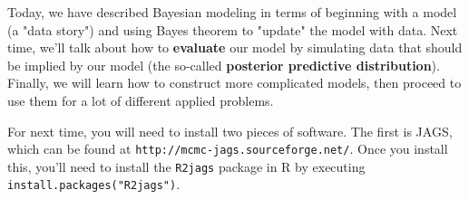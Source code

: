 \documentclass[11pt]{article}
\begin{document}
Today, we have described Bayesian modeling in terms of beginning with a model (a "data story") and using Bayes theorem to "update" the model with data.  Next time, we'll talk about how to \textbf{evaluate} our model by simulating data that should be implied by our model (the so-called \textbf{posterior predictive distribution}).  Finally, we will learn how to construct more complicated models, then proceed to use them for a lot of different applied problems.

For next time, you will need to install two pieces of software.  The first is JAGS, which can be found at \texttt{http://mcmc-jags.sourceforge.net/}.  Once you install this, you'll need to install the \texttt{R2jags} package in R by executing \texttt{install.packages("R2jags")}.
\end{document}
